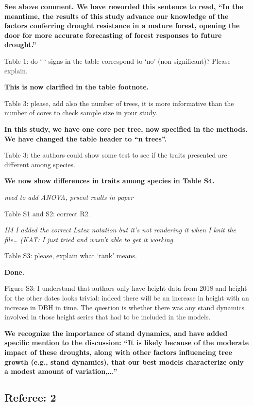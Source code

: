 \documentclass[
]{article}
\begin{document}
\textbf{See above comment. We have reworded this sentence to read, ``In
the meantime, the results of this study advance our knowledge of the
factors conferring drought resistance in a mature forest, opening the
door for more accurate forecasting of forest responses to future
drought.''}

Table 1: do `-` signs in the table correspond to `no' (non-significant)?
Please explain.

\textbf{This is now clarified in the table footnote.}

Table 3: please, add also the number of trees, it is more informative
than the number of cores to check sample size in your study.

\textbf{In this study, we have one core per tree, now specified in the
methods. We have changed the table header to ``n trees''.}

Table 3: the authors could show some test to see if the traits presented
are different among species.

\textbf{We now show differences in traits among species in Table S4.}

\emph{need to add ANOVA, prsent reults in paper}

Table S1 and S2: correct R2.

\emph{IM I added the correct Latex notation but it's not rendering it
when I knit the file\ldots{} (KAT: I just tried and wasn't able to get
it working.}

Table S3: please, explain what `rank' means.

\textbf{Done.}

Figure S3: I understand that authors only have height data from 2018 and
height for the other dates looks trivial: indeed there will be an
increase in height with an increase in DBH in time. The question is
whether there was any stand dynamics involved in those height series
that had to be included in the models.

\textbf{We recognize the importance of stand dynamics, and have added
specific mention to the discussion: ``It is likely because of the
moderate impact of these droughts, along with other factors influencing
tree growth (e.g., stand dynamics), that our best models characterize
only a modest amount of variation,\ldots{}''}

\hypertarget{referee-2}{%
\subsection{Referee: 2}\label{referee-2}}
\end{document}
